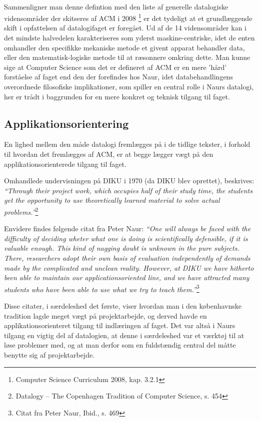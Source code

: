 \documentclass[10pt,a4paper]{article}
\newcommand{\citat}[2]{\vspace{0.1cm}\newline\textit{``#1''}\hspace{0.1cm}\footnote{#2}\vspace{0.1cm}\newline}
\begin{document}
\paragraph{}
Sammenligner man denne defintion med den liste af generelle datalogiske vidensområder
der skitseres af ACM i 2008 \footnote{Computer Science Curriculum 2008, kap. 3.2.1} er det 
tydeligt at et grundlæggende skift i opfattelsen af datalogifaget er foregået. Ud af
de 14 vidensområder kan i det mindste halvedelen karakteriseres som yderst 
maskine-centriske, idet de enten omhandler den specifikke mekaniske 
metode et givent apparat behandler data, eller den matematisk-logiske 
metode til at ræsonnere omkring dette. Man kunne sige at Computer Science
som det er defineret af ACM er en mere 'hård' forståelse af faget end den 
der forefindes hos Naur, idet databehandlingens overordnede filosofiske 
implikationer, som spiller en central rolle i Naurs datalogi, her er 
trådt i baggrunden for en mere konkret og teknisk tilgang til faget. 

\subsection{Applikationsorientering}
En lighed mellem den måde datalogi fremlægges på i de tidlige tekster, i forhold
til hvordan det fremlægges af ACM, er at begge lægger vægt på den
applikationsorienterede tilgang til faget.

Omhandlede undervisningen på DIKU i 1970 (da DIKU blev oprettet), beskrives:
\citat{Through their project work, which occupies half of their study time, the
    students get the opportunity to use theoretically learned material to solve
    actual problems.}{Datalogy -- The Copenhagen Tradition of Computer
    Science, s. 454}

Envidere findes følgende citat fra Peter Naur: \citat{One will always be faced
    with the difficulty of deciding wheter what one is doing is scientifically
    defensible, if it is valuable enough. This kind of nagging doubt is unknown
    in the pure subjects. There, researchers adopt their own basis of evaluation
    independently of demands made by the complicated and unclean reality.
    However, at DIKU we have hitherto been able to maintain our
    applicationsoriented line, and we have attracted many students who have been
    able to use what we try to teach them.}{Citat fra Peter Naur, Ibid., s. 469}

Disse citater, i særdeleshed det første, viser hvordan man i den københavnske
tradition lagde meget vægt på projektarbejde, og derved havde en
applikationsorienteret tilgang til indlæringen af faget. Det var altså i Naurs
tilgang en vigtig del af datalogien, at denne i særdeleshed var et værktøj til
at løse problemer med, og at man derfor som en fuldstændig central del måtte
benytte sig af projektarbejde.
\end{document}
